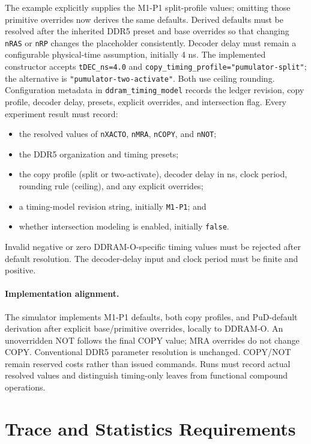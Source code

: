 \documentclass[9pt,twocolumn]{extarticle}
\newcommand{\cmd}[1]{\texttt{#1}}
\newcommand{\param}[1]{\texttt{#1}}
\newcommand{\timingrevision}{M1-P1}
\begin{document}
The example explicitly supplies the \timingrevision{} split-profile values;
omitting those primitive overrides now derives the same defaults.
Derived defaults must be resolved after
the inherited DDR5 preset and base overrides so that changing \param{nRAS}
or \param{nRP} changes the placeholder consistently. Decoder delay must
remain a configurable physical-time assumption, initially 4 ns. The implemented
constructor accepts \cmd{tDEC\_ns=4.0} and
\cmd{copy\_timing\_profile="pumulator-split"}; the alternative is
\cmd{"pumulator-two-activate"}. Both use ceiling rounding. Configuration
metadata in \cmd{ddram\_timing\_model} records the ledger revision, copy
profile, decoder delay, presets, explicit overrides, and intersection flag.
Every experiment result must record:

\begin{itemize}
  \item the resolved values of \param{nXACTO}, \param{nMRA},
        \param{nCOPY}, and \param{nNOT};
  \item the DDR5 organization and timing presets;
  \item the copy profile (split or two-activate), decoder delay in ns,
        clock period, rounding rule (ceiling), and any explicit overrides;
  \item a timing-model revision string, initially
        \cmd{\timingrevision}; and
  \item whether intersection modeling is enabled, initially \cmd{false}.
\end{itemize}

Invalid negative or zero DDRAM-O-specific timing values must be rejected after
default resolution. The decoder-delay input and clock period must be finite
and positive.

\paragraph{Implementation alignment.}
The simulator implements \timingrevision{} defaults, both copy profiles, and
PuD-default derivation after explicit base/primitive overrides, locally to
DDRAM-O. An unoverridden NOT follows the final COPY value; MRA overrides do
not change COPY. Conventional DDR5 parameter resolution is unchanged.
COPY/NOT remain reserved costs rather than issued commands. Runs must record
actual resolved values and distinguish timing-only leaves from functional
compound operations.

\section{Trace and Statistics Requirements}
\end{document}
